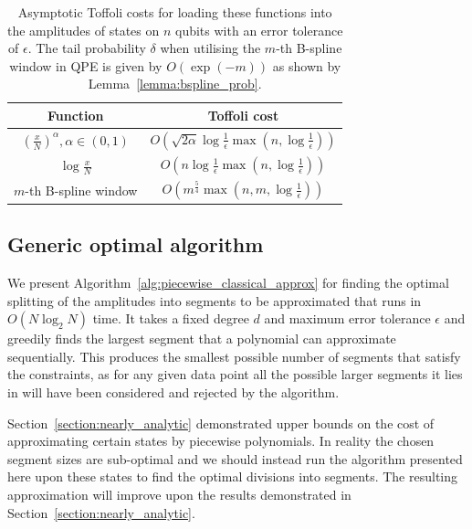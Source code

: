 \documentclass[aps,prx,twocolumn,floatfix,10pt,amssymb,amsfont,amsmath,superscriptaddress,float,nofootinbib,longbibliography,nobalancelastpage]{revtex4-2}
\theoremstyle{empty}
\begin{document}
\begin{table}[hbtp]
            \centering
            
            \begin{tabular}{|c|c|}
            \hline
            Function & Toffoli cost \\ \hline\hline
                \rule{0pt}{1.25em}$\left(\frac{x}{N}\right)^{\alpha}, \alpha \in (0,1)$ &  $O\left(\sqrt{2\alpha} \log \frac{1}{\epsilon}\max(n, \log\frac{1}{\epsilon})\right)$ \\[0.5em] \hline
                \rule{0pt}{1.25em}$\log \frac{x}{N}$ &  $O\left(n\log \frac{1}{\epsilon}\max(n, \log\frac{1}{\epsilon})\right)$ \\[0.5em] \hline
                \rule{0pt}{1.25em}$m$-th B-spline window & $O\left(m^{\frac{5}{4}}\max \left(n,m, \log \frac{1}{\epsilon}\right)\right)$ \\[0.5em] \hline
            \end{tabular}
            
            \caption{\label{tab:resource_costs}Asymptotic Toffoli costs for loading these functions into the amplitudes of states on $n$ qubits with an error tolerance of $\epsilon$. The tail probability $\delta$ when utilising the $m$-th B-spline window in QPE is given by $O(\exp (-m))$ as shown by Lemma~\ref{lemma:bspline_prob}.}
        \end{table}

\subsection{Generic optimal algorithm}
\label{section:algorithm}
We present Algorithm~\ref{alg:piecewise_classical_approx} for finding the optimal splitting of the amplitudes into segments to be approximated that runs in $O(N \log_2 N)$ time. It takes a fixed degree $d$ and maximum error tolerance $\epsilon$ and greedily finds the largest segment that a polynomial can approximate sequentially. This produces the smallest possible number of segments that satisfy the constraints, as for any given data point all the possible larger segments it lies in will have been considered and rejected by the algorithm. 

Section~\ref{section:nearly_analytic} demonstrated upper bounds on the cost of approximating certain states by piecewise polynomials. In reality the chosen segment sizes are sub-optimal and we should instead run the algorithm presented here upon these states to find the optimal divisions into segments. The resulting approximation will improve upon the results demonstrated in Section~\ref{section:nearly_analytic}. 
\end{document}
